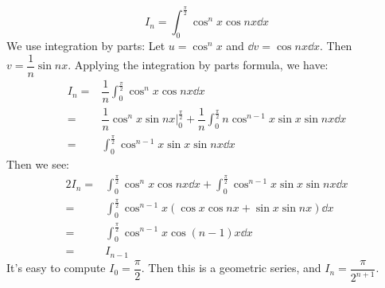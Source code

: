 \documentclass[12pt]{article}
\begin{document}
\begin{enumerate}
\begin{equation*}
        I_n = \int_0^\frac{\pi}{2}\cos^n x \cos nx \dd x
    \end{equation*}
    We use integration by parts: Let $u = \cos^nx$ and $\dd v = \cos nx \dd x$. Then $v = \dfrac{1}{n}\sin nx$. Applying the integration by parts formula, we have:
    \begin{align*}
        I_n = & \dfrac{1}{n} \int_0^\frac{\pi}{2}\cos^n x \cos nx \dd x \\
        = & \dfrac{1}{n} \cos ^n x \sin nx \Big|_0^{\frac{\pi}{2}} + \dfrac{1}{n}  \int_0^{\frac{\pi}{2}} n \cos ^{n-1} x \sin x \sin nx  \dd x \\
        = &  \int_0^{\frac{\pi}{2}} \cos ^{n-1} x \sin x \sin nx  \dd x
    \end{align*}
    Then we see:
    \begin{align*}
        2I_n = & \int_0^\frac{\pi}{2}\cos^n x \cos nx \dd x + \int_0^{\frac{\pi}{2}} \cos ^{n-1} x \sin x \sin nx  \dd x \\
        = & \int_0^\frac{\pi}{2} \cos^{n-1}x (\cos x \cos nx + \sin x \sin nx) \dd x \\
        = & \int_0^\frac{\pi}{2} \cos^{n-1}x \cos(n-1)x \dd x \\
        =& I_{n-1}
    \end{align*}
    It's easy to compute $I_0 = \dfrac{\pi}{2}$. Then this is a geometric series, and $I_n = \dfrac{\pi}{2^{n+1}}$.
\end{enumerate}
\end{document}
